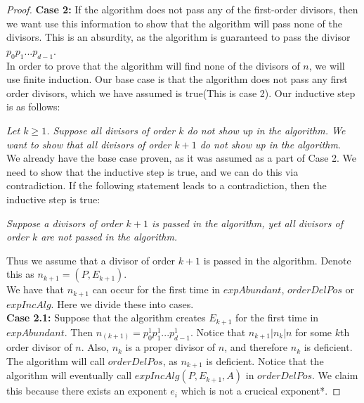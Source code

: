 \documentclass[../paper.tex]{subfiles}
\begin{document}
\begin{proof}
\textbf{Case 2:}
  If the algorithm does not pass any of the first-order divisors,
then we want use this information to show that the algorithm will
pass none of the divisors. This is an absurdity, as the
algorithm is guaranteed to pass the divisor $p_0 p_1 ... p_{d-1}$.
\\

  In order to prove that the algorithm will find none of the
divisors of $n$, we will use finite induction. Our base case is
that the algorithm does not pass any first order divisors, which
we have assumed is true(This is case 2). Our inductive step is as
follows:

\textit{Let $k \geq 1$. Suppose all divisors of order $k$ do not
show up in the algorithm. We want to show that all divisors of
order $k + 1$ do not show up in the algorithm}.
\\

  We already have the base case proven, as it was assumed as a part
of Case 2. We need to show that the inductive step is true, and we
can do this via contradiction. If the following statement leads to
a contradiction, then the inductive step is true:

\textit{Suppose a divisors of order $k + 1$ is passed in the
algorithm, yet all divisors of order $k$ are not passed in the
algorithm.}

Thus we assume that a divisor of order $k + 1$ is passed in the
algorithm. Denote this as $n_{k+1} = (P, E_{k + 1})$. 
\\

We have that $n_{k + 1}$ can occur for the first time in
$expAbundant$, $orderDelPos$ or $expIncAlg$. Here we divide these
into cases.
\\


\textbf{Case 2.1:} 
  Suppose that the algorithm creates $E_{k+1}$ for the first time in
$expAbundant$. Then $n_{(k+1)} = p_0^1 p_1^1 ... p_{d-1}^1$.
Notice that $n_{k + 1} | n_{k} | n$ for some $k$th order divisor
of $n$. Also, $n_k$ is a proper divisor of $n$, and therefore
$n_k$ is deficient.
\\


  The algorithm will call $orderDelPos$, as $n_{k+1}$ is 
deficient. Notice that the algorithm will eventually
call $expIncAlg(P, E_{k+1}, A)$ in $orderDelPos$. We claim this
because there exists an exponent $e_i$ which is not a crucical 
exponent*.


\end{proof}
\end{document}
